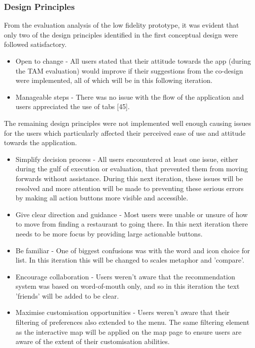 \documentclass[a4 paper, 12pt]{article}
\begin{document}
    \subsubsection{Design Principles}
    From the evaluation analysis of the low fidelity prototype, it was evident that only two of the design principles identified in the first conceptual design were followed satisfactory.   
    \begin{itemize}
        \item Open to change - All users stated that their attitude towards the app (during the TAM evaluation) would improve if their suggestions from the co-design were implemented, all of which will be in this following iteration.  
        \item Manageable steps - There was no issue with the flow of the application and users appreciated the use of tabs [45].
    \end{itemize}
    
    The remaining design principles were not implemented well enough causing issues for the users which particularly affected their perceived ease of use and attitude towards the application.
        \begin{itemize}
            \item Simplify decision process - All users encountered at least one issue, either during the gulf of execution or evaluation, that prevented them from moving forwards without assistance. During this next iteration, these issues will be resolved and more attention will be made to preventing these serious errors by making all action buttons more visible and accessible.
            \item Give clear direction and guidance - Most users were unable or unsure of how to move from finding a restaurant to going there. In this next iteration there needs to be more focus by providing large actionable buttons.
            \item Be familiar - One of biggest confusions was with the word and icon choice for list. In this iteration this will be changed to scales metaphor and 'compare'. 
            \item Encourage collaboration - Users weren't aware that the recommendation system was based on word-of-mouth only, and so in this iteration the text 'friends' will be added to be clear.
            \item Maximise customisation opportunities - Users weren't aware that their filtering of preferences also extended to the menu. The same filtering element as the interactive map will be applied on the map page to ensure users are aware of the extent of their customisation abilities.
        \end{itemize}
\end{document}
